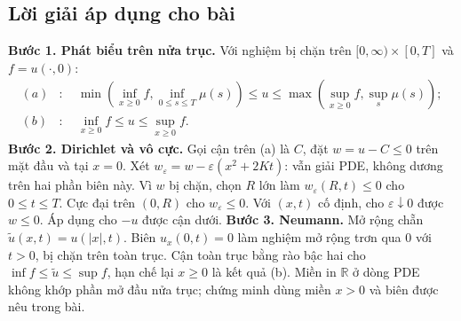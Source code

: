 \documentclass[10pt,a4paper]{article}
\begin{document}
\subsection*{Lời giải áp dụng cho bài}
\textbf{Bước 1. Phát biểu trên nửa trục.} Với nghiệm bị chặn trên $[0,\infty)\times[0,T]$ và $f=u(\cdot,0)$:
\begin{align*}
(a)&:\quad \min(\inf_{x\ge0}f,\inf_{0\le s\le T}\mu(s))
\le u\le\max(\sup_{x\ge0}f,\sup_s\mu(s));\\
(b)&:\quad \inf_{x\ge0}f\le u\le\sup_{x\ge0}f.
\end{align*}
\textbf{Bước 2. Dirichlet và vô cực.} Gọi cận trên (a) là $C$, đặt $w=u-C\le0$ trên mặt đầu và tại $x=0$. Xét $w_\varepsilon=w-\varepsilon(x^2+2Kt)$: vẫn giải PDE, không dương trên hai phần biên này. Vì $w$ bị chặn, chọn $R$ lớn làm $w_\varepsilon(R,t)\le0$ cho $0\le t\le T$. Cực đại trên $(0,R)$ cho $w_\varepsilon\le0$. Với $(x,t)$ cố định, cho $\varepsilon\downarrow0$ được $w\le0$. Áp dụng cho $-u$ được cận dưới.
\textbf{Bước 3. Neumann.} Mở rộng chẵn $\widetilde u(x,t)=u(|x|,t)$. Biên $u_x(0,t)=0$ làm nghiệm mở rộng trơn qua $0$ với $t>0$, bị chặn trên toàn trục. Cận toàn trục bằng rào bậc hai cho $\inf f\le\widetilde u\le\sup f$, hạn chế lại $x\ge0$ là kết quả (b).
Miền in $\mathbb R$ ở dòng PDE không khớp phần mở đầu nửa trục; chứng minh dùng miền $x>0$ và biên được nêu trong bài.
\end{document}
